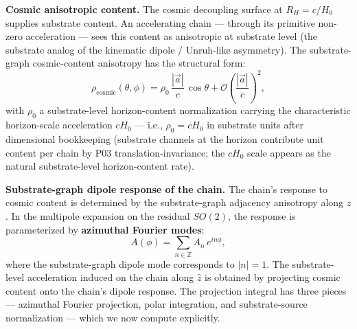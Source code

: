 \documentclass[11pt,a4paper]{article}
\begin{document}
\textbf{Cosmic anisotropic content.} The cosmic decoupling surface at $R_H = c/H_0$ supplies substrate content. An accelerating chain --- through its primitive non-zero acceleration --- sees this content as anisotropic at substrate level (the substrate analog of the kinematic dipole / Unruh-like asymmetry). The substrate-graph cosmic-content anisotropy has the structural form:
\[
\rho_\mathrm{cosmic}(\theta, \phi) = \rho_0\,\frac{|\vec{a}|}{c}\,\cos\theta + \mathcal{O}\!\left(\frac{|\vec{a}|}{c}\right)^{\!2},
\]
with $\rho_0$ a substrate-level horizon-content normalization carrying the characteristic horizon-scale acceleration $cH_0$ --- i.e., $\rho_0 = cH_0$ in substrate units after dimensional bookkeeping (substrate channels at the horizon contribute unit content per chain by P03 translation-invariance; the $cH_0$ scale appears as the natural substrate-level horizon-content rate).

\textbf{Substrate-graph dipole response of the chain.} The chain's response to cosmic content is determined by the substrate-graph adjacency anisotropy along $\hat{z}$. In the multipole expansion on the residual $SO(2)$, the response is parameterized by \textbf{azimuthal Fourier modes}:
\[
A(\phi) = \sum_{n \in \mathbb{Z}} A_n\,e^{in\phi},
\]
where the substrate-graph dipole mode corresponds to $|n|=1$. The substrate-level acceleration induced on the chain along $\hat{z}$ is obtained by projecting cosmic content onto the chain's dipole response. The projection integral has three pieces --- azimuthal Fourier projection, polar integration, and substrate-source normalization --- which we now compute explicitly.
\end{document}
